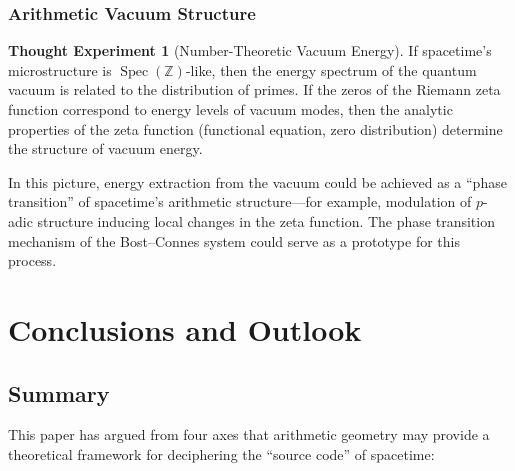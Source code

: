 \documentclass[12pt,a4paper]{article}
\theoremstyle{definition}
\newtheorem{thought}[definition]{Thought Experiment}
\newcommand{\Spec}{\operatorname{Spec}}
\begin{document}
\subsubsection{Arithmetic Vacuum Structure}

\begin{thought}[Number-Theoretic Vacuum Energy]
If spacetime's microstructure is $\Spec(\mathbb{Z})$-like, then the energy spectrum of the quantum vacuum is related to the distribution of primes. If the zeros of the Riemann zeta function correspond to energy levels of vacuum modes, then the analytic properties of the zeta function (functional equation, zero distribution) determine the structure of vacuum energy.

In this picture, energy extraction from the vacuum could be achieved as a ``phase transition'' of spacetime's arithmetic structure---for example, modulation of $p$-adic structure inducing local changes in the zeta function. The phase transition mechanism of the Bost--Connes system \cite{BostConnes1995} could serve as a prototype for this process.
\end{thought}


\newpage
\section{Conclusions and Outlook}
\label{sec:conclusion}

\subsection{Summary}

This paper has argued from four axes that arithmetic geometry may provide a theoretical framework for deciphering the ``source code'' of spacetime:
\end{document}
